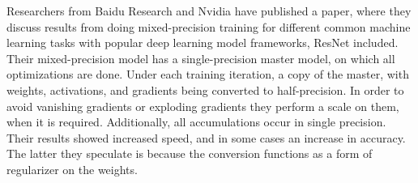 Researchers from Baidu Research and Nvidia have published a paper, where they discuss results from doing mixed-precision training for different common machine learning tasks with popular deep learning model frameworks, ResNet included\cite{Micikevicius2018}. Their mixed-precision model has a single-precision master model, on which all optimizations are done. Under each training iteration, a copy of the master, with weights, activations, and gradients being converted to half-precision. In order to avoid vanishing gradients or exploding gradients they perform a scale on them, when it is required. Additionally, all accumulations occur in single precision. Their results showed increased speed, and in some cases an increase in accuracy. The latter they speculate is because the conversion functions as a form of regularizer on the weights.
